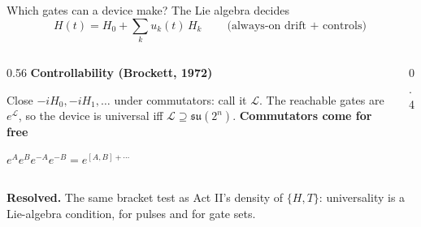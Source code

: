 \documentclass[aspectratio=169,11pt]{beamer}
\newcommand{\su}{\mathfrak{su}}
\newcommand{\blocktitle}[1]{{\bfseries #1}\par\vskip1mm}
\newcommand{\resolved}[1]{\begin{takeaway}\textbf{Resolved.} #1\end{takeaway}}
\begin{document}
\begin{frame}{Which gates can a device make? The Lie algebra decides}
  \[ H(t)=H_0+\textstyle\sum_k u_k(t)\,H_k\qquad\text{(always-on drift $+$ controls)} \]
  \begin{columns}[c]
    \begin{column}{0.56\textwidth}
      \blocktitle{Controllability (Brockett, 1972)}
      Close $-iH_0,-iH_1,\dots$ under commutators: call it $\mathcal L$. The reachable gates are $e^{\mathcal L}$, so the device is universal iff $\mathcal L\supseteq\su(2^n)$.
      \vskip2mm
      \blocktitle{Commutators come for free}
      $e^{A}e^{B}e^{-A}e^{-B}=e^{[A,B]+\cdots}$
    \end{column}
    \begin{column}{0.4\textwidth}
      \centering
    \end{column}
  \end{columns}
  \resolved{The same bracket test as Act II's density of $\{H,T\}$: universality is a Lie-algebra condition, for pulses and for gate sets.}
\end{frame}
\end{document}
